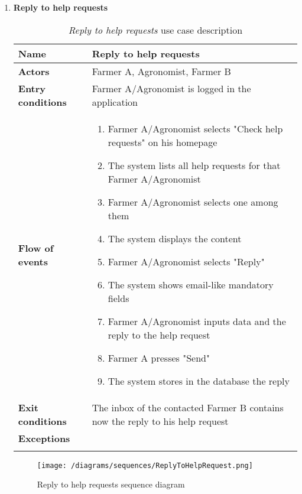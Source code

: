 \begin{enumerate}
	
			\item \textbf{Reply to help requests}
				\begin{longtable}{p{0.26\linewidth}p{0.75\linewidth}}
					\toprule
					\textbf{Name} & \textbf{Reply to help requests} \\
					\midrule
					\textbf{Actors} & Farmer A, Agronomist, Farmer B \\
					\midrule
					\textbf{Entry conditions} & Farmer A/Agronomist is logged in the application \\
					\midrule
					\textbf{Flow of events} & 
					\begin{enumerate}
						\item Farmer A/Agronomist selects "Check help requests" on his homepage
						\item The system lists all help requests for that Farmer A/Agronomist
						\item Farmer A/Agronomist selects one among them
						\item The system displays the content
						\item Farmer A/Agronomist selects "Reply"
						\item The system shows email-like mandatory fields
						\item Farmer A/Agronomist inputs data and the reply to the help request
						\item Farmer A presses "Send"
						\item The system stores in the database the reply
					\end{enumerate} \\
					\midrule
					\textbf{Exit conditions} & The inbox of the contacted Farmer B contains now the reply to his help request
					\\
					\midrule
					\textbf{Exceptions} & \\
					\bottomrule
					\caption{\emph{Reply to help requests} use case description}
				\end{longtable}
			
				\begin{figure}[h]
					\centering
					\texttt{[image: /diagrams/sequences/ReplyToHelpRequest.png]}
					\caption{Reply to help requests sequence diagram}
				\end{figure}
			

\end{enumerate}
